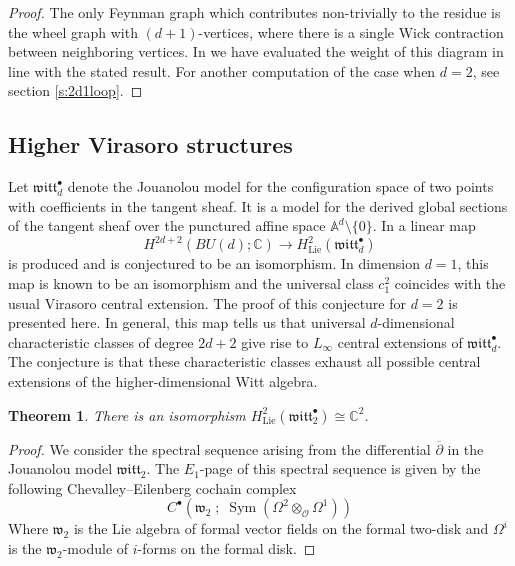 \documentclass[11pt]{amsart}
\newtheorem{thm}{Theorem}[section]
\theoremstyle{definition}
\theoremstyle{remark}
\numberwithin{equation}{section}
\newcommand{\bu}{\bullet}
\newcommand{\op}{\operatorname}
\newcommand{\C}{\mathbb{C}}
\newcommand{\dbar}{\overline{\partial}}
\newcommand{\cO}{\mathcal{O}}
\begin{document}
\begin{proof}
  The only Feynman graph which contributes non-trivially to the residue is the wheel graph with $(d+1)$-vertices, where there is a single Wick contraction between neighboring vertices.
  In \cite{GWkm} we have evaluated the weight of this diagram in line with the stated result.
  For another computation of the case when $d=2$, see section \ref{s:2d1loop}. 
\end{proof}


\subsection{Higher Virasoro structures}


Let $\mathfrak{witt}_d^\bu$ denote the Jouanolou model for the configuration space of two points with coefficients in
the tangent sheaf.
It is a model for the derived global sections of the tangent sheaf over the punctured affine space $\mathbb{A}^d
\setminus \{0\}$.
In \cite{bwvir2} a linear map 
\begin{equation}\label{}
  H^{2d+2}(BU(d) ; \mathbb{C}) \to H^2_{\op{Lie}} (\mathfrak{witt}_d^\bu) 
\end{equation}
is produced and is conjectured to be an isomorphism.
In dimension $d=1$, this map is known to be an isomorphism and the universal class $c_1^2$ coincides with the usual
Virasoro central extension.
The proof of this conjecture for $d=2$ is presented here.
In general, this map tells us that universal $d$-dimensional characteristic classes of degree $2d+2$ give rise to $L_\infty$ central
extensions of $\mathfrak{witt}_d^\bu$.
The conjecture is that these characteristic classes exhaust all possible central extensions of the higher-dimensional
Witt algebra.

\begin{thm}
  There is an isomorphism $H^{2}_{\op{Lie}} (\mathfrak{witt}_2^\bu) \cong \C^2$.
\end{thm}

\begin{proof}
  We consider the spectral sequence arising from the differential $\dbar$ in the Jouanolou model $\mathfrak{witt}_2$.
  The $E_1$-page of this spectral sequence is given by the following Chevalley--Eilenberg cochain complex
  \begin{equation}\label{}
    C^\bu\left(\mathfrak{w}_2 \; ; \; \op{Sym} (\Omega^2 \otimes_{\cO} \Omega^1) \right)
  \end{equation}
  Where $\mathfrak{w}_2$ is the Lie algebra of formal vector fields on the formal two-disk and $\Omega^i$ is the
  $\mathfrak{w}_2$-module of $i$-forms on the formal disk.
\end{proof}
\end{document}
